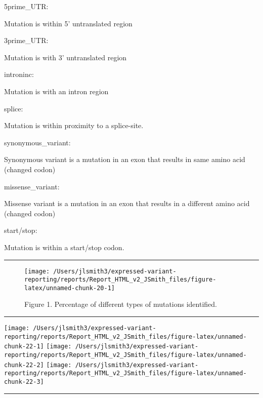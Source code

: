 \documentclass[
]{article}
\begin{document}
5prime\_UTR:

Mutation is within 5' untranslated region

3prime\_UTR:

Mutation is with 3' untranslated region

introninc:

Mutation is with an intron region

splice:

Mutation is within proximity to a splice-site.

synonymous\_variant:

Synonymous variant is a mutation in an exon that results in same amino
acid (changed codon)

missense\_variant:

Missense variant is a mutation in an exon that results in a different
amino acid (changed codon)

start/stop:

Mutation is within a start/stop codon.

\begin{center}\rule{0.5\linewidth}{0.5pt}\end{center}

\begin{figure}

{\centering \texttt{[image: /Users/jlsmith3/expressed-variant-reporting/reports/Report\_HTML\_v2\_JSmith\_files/figure-latex/unnamed-chunk-20-1]} 

}

\caption{Figure 1. Percentage of different types of mutations identified.}\label{fig:unnamed-chunk-20}
\end{figure}

\begin{center}\rule{0.5\linewidth}{0.5pt}\end{center}

\begin{center}\texttt{[image: /Users/jlsmith3/expressed-variant-reporting/reports/Report\_HTML\_v2\_JSmith\_files/figure-latex/unnamed-chunk-22-1]} \texttt{[image: /Users/jlsmith3/expressed-variant-reporting/reports/Report\_HTML\_v2\_JSmith\_files/figure-latex/unnamed-chunk-22-2]} \texttt{[image: /Users/jlsmith3/expressed-variant-reporting/reports/Report\_HTML\_v2\_JSmith\_files/figure-latex/unnamed-chunk-22-3]} \end{center}

\begin{center}\rule{0.5\linewidth}{0.5pt}\end{center}
\end{document}
